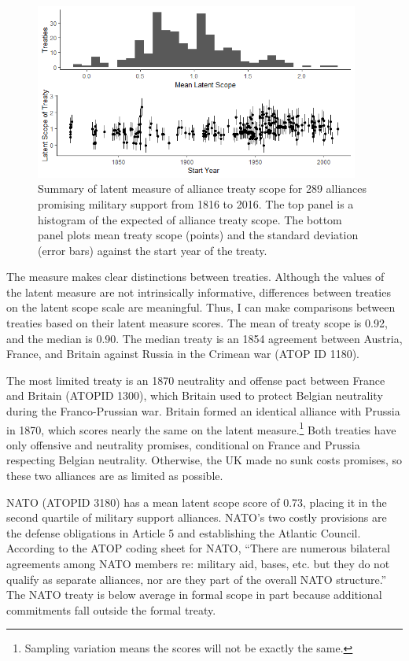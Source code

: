 \documentclass[12pt]{article}
\begin{document}
\begin{figure}
	\centering
		\includegraphics[width=0.95\textwidth]{../figures/ls-summary.png}
	\caption{Summary of latent measure of alliance treaty scope for 289 alliances promising military support from 1816 to 2016. The top panel is a histogram of the expected of alliance treaty scope. The bottom panel plots mean treaty scope (points) and the standard deviation (error bars) against the start year of the treaty.}
	\label{fig:ls-summary}
\end{figure}


The measure makes clear distinctions between treaties. 
Although the values of the latent measure are not intrinsically informative, differences between treaties on the latent scope scale are meaningful. 
Thus, I can make comparisons between treaties based on their latent measure scores. 
The mean of treaty scope is 0.92, and the median is 0.90. 
The median treaty is an 1854 agreement between Austria, France, and Britain against Russia in the Crimean war (ATOP ID 1180). 


The most limited treaty is an 1870 neutrality and offense pact between France and Britain (ATOPID 1300), which Britain used to protect Belgian neutrality during the Franco-Prussian war.  
Britain formed an identical alliance with Prussia in 1870, which scores nearly the same on the latent measure.\footnote{
Sampling variation means the scores will not be exactly the same.} 
Both treaties have only offensive and neutrality promises, conditional on France and Prussia respecting Belgian neutrality. 
Otherwise, the UK made no sunk costs promises, so these two alliances are as limited as possible. 


NATO (ATOPID 3180) has a mean latent scope score of 0.73, placing it in the second quartile of military support alliances. 
NATO's two costly provisions are the defense obligations in Article 5 and establishing the Atlantic Council. 
According to the ATOP coding sheet for NATO, ``There are numerous bilateral agreements among NATO members re: military aid, bases, etc. but they do not qualify as separate alliances, nor are they part of the overall NATO structure.''
The NATO treaty is below average in formal scope in part because additional commitments fall outside the formal treaty.    
\end{document}
